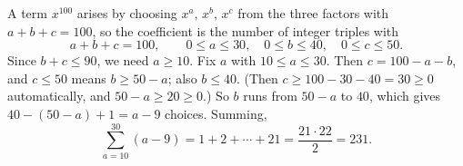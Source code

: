 A term $x^{100}$ arises by choosing $x^a$, $x^b$, $x^c$ from the three factors with $a+b+c=100$, so the coefficient is the number of integer triples with
\[
a+b+c=100,\qquad0\le a\le30,\quad0\le b\le40,\quad0\le c\le50 .
\]
Since $b+c\le90$, we need $a\ge10$. Fix $a$ with $10\le a\le30$. Then $c=100-a-b$, and $c\le50$ means $b\ge50-a$; also $b\le40$. (Then $c\ge100-30-40=30\ge0$ automatically, and $50-a\ge20\ge0$.) So $b$ runs from $50-a$ to $40$, which gives $40-(50-a)+1=a-9$ choices. Summing,
\[
\sum_{a=10}^{30}(a-9)=1+2+\cdots+21=\dfrac{21\cdot22}{2}=\boxed{231}.
\]

